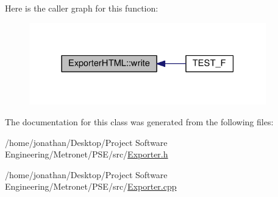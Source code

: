 Here is the caller graph for this function\+:
\nopagebreak
\begin{figure}[H]
\begin{center}
\leavevmode
\includegraphics[width=291pt]{class_exporter_h_t_m_l_ace2649c240282289d4cb3bfbd19e427c_icgraph}
\end{center}
\end{figure}




The documentation for this class was generated from the following files\+:\begin{DoxyCompactItemize}
\item 
/home/jonathan/\+Desktop/\+Project Software Engineering/\+Metronet/\+P\+S\+E/src/\hyperlink{_exporter_8h}{Exporter.\+h}\item 
/home/jonathan/\+Desktop/\+Project Software Engineering/\+Metronet/\+P\+S\+E/src/\hyperlink{_exporter_8cpp}{Exporter.\+cpp}\end{DoxyCompactItemize}
